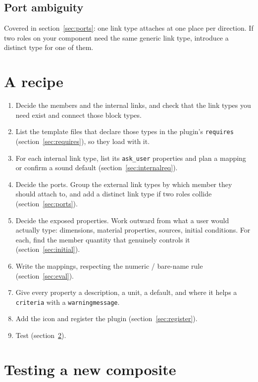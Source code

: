 \documentclass[11pt,a4paper]{article}
\newcommand{\code}[1]{\texttt{\small #1}}
\begin{document}
\subsection{Port ambiguity}

Covered in section~\ref{sec:ports}: one link type attaches at one place per
direction. If two roles on your component need the same generic link type,
introduce a distinct type for one of them.

\section{A recipe}

\begin{enumerate}[leftmargin=1.6em]
\item Decide the members and the internal links, and check that the link types
you need exist and connect those block types.
\item List the template files that declare those types in the plugin's
\code{requires} (section~\ref{sec:requires}), so they load with it.
\item For each internal link type, list its \code{ask\_user} properties and plan
a mapping or confirm a sound default (section~\ref{sec:internalreq}).
\item Decide the ports. Group the external link types by which member they
should attach to, and add a distinct link type if two roles collide
(section~\ref{sec:ports}).
\item Decide the exposed properties. Work outward from what a user would
actually type: dimensions, material properties, sources, initial conditions.
For each, find the member quantity that genuinely controls it
(section~\ref{sec:initial}).
\item Write the mappings, respecting the numeric / bare-name rule
(section~\ref{sec:eval}).
\item Give every property a description, a unit, a default, and where it helps
a \code{criteria} with a \code{warningmessage}.
\item Add the icon and register the plugin (section~\ref{sec:register}).
\item Test (section~\ref{sec:testing}).
\end{enumerate}

\section{Testing a new composite}\label{sec:testing}
\end{document}
